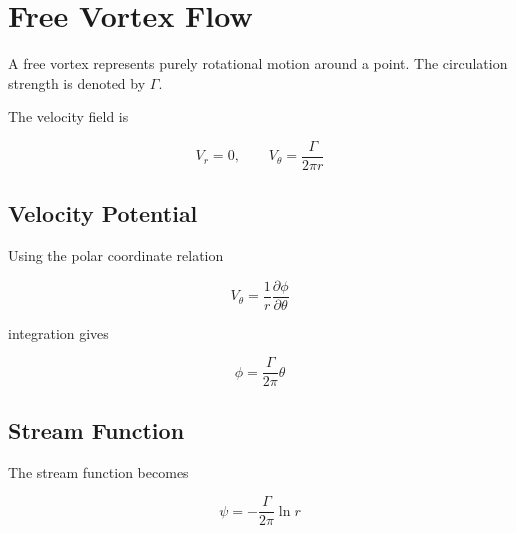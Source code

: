 \section{Free Vortex Flow}
\label{sec:free-vortex}

A free vortex represents purely rotational motion around a point.
The circulation strength is denoted by $\Gamma$.

\bigskip

The velocity field is

\[
V_r = 0,
\qquad
V_\theta
=
\frac{\Gamma}{2\pi r}
\]

\subsection{Velocity Potential}
\label{subsec:free-vortex-flow-velocity-potential}

Using the polar coordinate relation

\[
V_\theta
=
\frac{1}{r}
\frac{\partial\phi}{\partial\theta}
\]

integration gives

\[
\boxed{
\phi
=
\frac{\Gamma}{2\pi}\theta
}
\]

\subsection{Stream Function}
\label{subsec:free-vortex-flow-stream-function}

The stream function becomes

\[
\boxed{
\psi
=
-\frac{\Gamma}{2\pi}\ln r
}
\]

